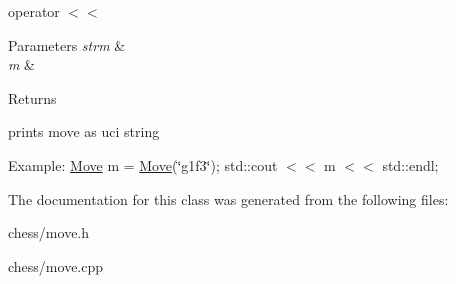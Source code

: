 operator $<$$<$ 


\begin{DoxyParams}{Parameters}
{\em strm} & \\
\hline
{\em m} & \\
\hline
\end{DoxyParams}
\begin{DoxyReturn}{Returns}

\end{DoxyReturn}
prints move as uci string

Example\-: \hyperlink{classchess_1_1Move}{Move} m = \hyperlink{classchess_1_1Move}{Move}(\char`\"{}g1f3\char`\"{}); std\-::cout $<$$<$ m $<$$<$ std\-::endl; 

The documentation for this class was generated from the following files\-:\begin{DoxyCompactItemize}
\item 
chess/move.\-h\item 
chess/move.\-cpp\end{DoxyCompactItemize}
